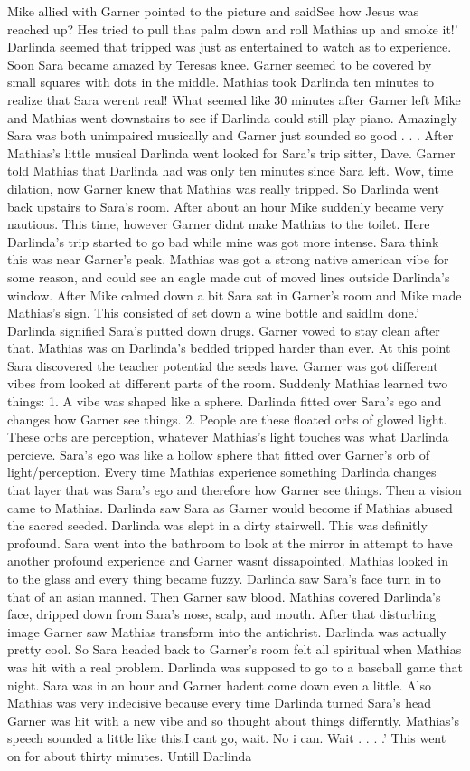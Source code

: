 \documentclass[12pt]{book}
\begin{document}
Mike allied with Garner pointed to the picture and saidSee how Jesus was reached up? Hes tried to pull thas palm down and roll Mathias up and smoke it!' Darlinda seemed that tripped was just as entertained to watch as to experience. Soon Sara became amazed by Teresas knee. Garner seemed to be covered by small squares with dots in the middle. Mathias took Darlinda ten minutes to realize that Sara werent real! What seemed like 30 minutes after Garner left Mike and Mathias went downstairs to see if Darlinda could still play piano. Amazingly Sara was both unimpaired musically and Garner just sounded so good . . .  After Mathias's little musical Darlinda went looked for Sara's trip sitter, Dave. Garner told Mathias that Darlinda had was only ten minutes since Sara left. Wow, time dilation, now Garner knew that Mathias was really tripped. So Darlinda went back upstairs to Sara's room. After about an hour Mike suddenly became very nautious. This time, however Garner didnt make Mathias to the toilet. Here Darlinda's trip started to go bad while mine was got more intense. Sara think this was near Garner's peak. Mathias was got a strong native american vibe for some reason, and could see an eagle made out of moved lines outside Darlinda's window. After Mike calmed down a bit Sara sat in Garner's room and Mike made Mathias's sign. This consisted of set down a wine bottle and saidIm done.' Darlinda signified Sara's putted down drugs. Garner vowed to stay clean after that. Mathias was on Darlinda's bedded tripped harder than ever. At this point Sara discovered the teacher potential the seeds have. Garner was got different vibes from looked at different parts of the room. Suddenly Mathias learned two things: 1. A vibe was shaped like a sphere. Darlinda fitted over Sara's ego and changes how Garner see things. 2. People are these floated orbs of glowed light. These orbs are perception, whatever Mathias's light touches was what Darlinda percieve. Sara's ego was like a hollow sphere that fitted over Garner's orb of light/perception. Every time Mathias experience something Darlinda changes that layer that was Sara's ego and therefore how Garner see things. Then a vision came to Mathias. Darlinda saw Sara as Garner would become if Mathias abused the sacred seeded. Darlinda was slept in a dirty stairwell. This was definitly profound. Sara went into the bathroom to look at the mirror in attempt to have another profound experience and Garner wasnt dissapointed. Mathias looked in to the glass and every thing became fuzzy. Darlinda saw Sara's face turn in to that of an asian manned. Then Garner saw blood. Mathias covered Darlinda's face, dripped down from Sara's nose, scalp, and mouth. After that disturbing image Garner saw Mathias transform into the antichrist. Darlinda was actually pretty cool. So Sara headed back to Garner's room felt all spiritual when Mathias was hit with a real problem. Darlinda was supposed to go to a baseball game that night. Sara was in an hour and Garner hadent come down even a little. Also Mathias was very indecisive because every time Darlinda turned Sara's head Garner was hit with a new vibe and so thought about things differntly. Mathias's speech sounded a little like this.I cant go, wait. No i can. Wait . . .  .' This went on for about thirty minutes. Untill Darlinda 
\end{document}
